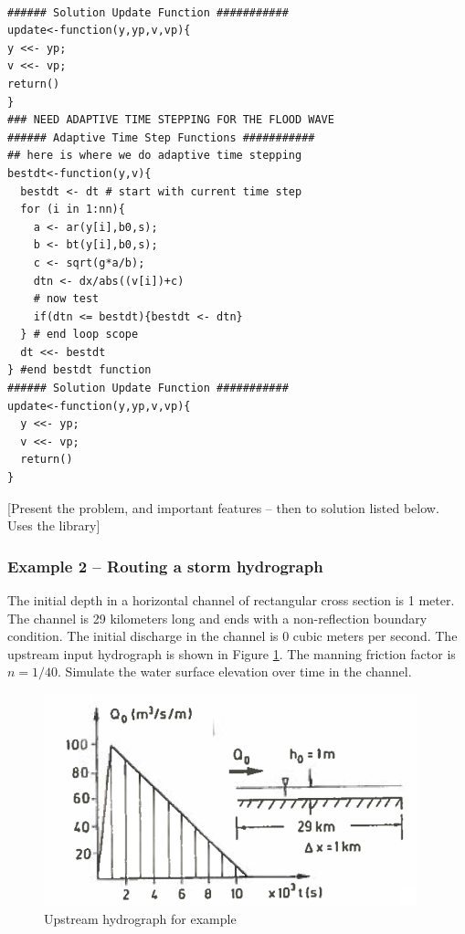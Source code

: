 \begin{lstlisting}[caption=R code demonstrating prototype updating function, label=lst:update-functions]

###### Solution Update Function ###########
update<-function(y,yp,v,vp){
y <<- yp;
v <<- vp;
return()
}
### NEED ADAPTIVE TIME STEPPING FOR THE FLOOD WAVE 
###### Adaptive Time Step Functions ###########
## here is where we do adaptive time stepping
bestdt<-function(y,v){
  bestdt <- dt # start with current time step
  for (i in 1:nn){
    a <- ar(y[i],b0,s);
    b <- bt(y[i],b0,s);
    c <- sqrt(g*a/b);
    dtn <- dx/abs((v[i])+c)
    # now test
    if(dtn <= bestdt){bestdt <- dtn}
  } # end loop scope
  dt <<- bestdt
} #end bestdt function
###### Solution Update Function ###########
update<-function(y,yp,v,vp){
  y <<- yp;
  v <<- vp;
  return()
}
\end{lstlisting}

[Present the problem, and important features -- then to solution listed below.  Uses the library]



\subsubsection{Example 2 -- Routing a storm hydrograph}
The initial depth in a horizontal channel of rectangular cross section is 1 meter.
The channel is 29 kilometers long and ends with a non-reflection boundary condition.
The initial discharge in the channel is 0 cubic meters per second.
The upstream input hydrograph is shown in Figure \ref{fig:upstreamHydro}.
The manning friction factor is $n=1/40$.  
Simulate the water surface elevation over time in the channel.

\begin{figure}[h!] %
   \centering
   \includegraphics[width=4.25in]{upstreamHydro.jpg} 
   \caption{Upstream hydrograph for example}
   \label{fig:upstreamHydro}
\end{figure}

